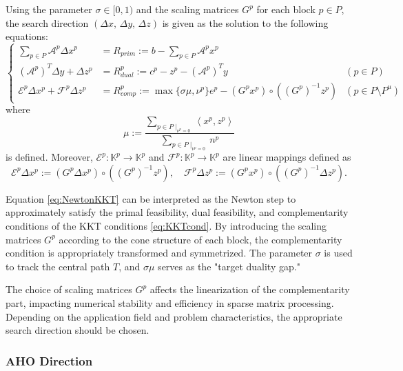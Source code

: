 Using the parameter $\sigma \in [0,1)$ and the scaling matrices $G^p$ for each block $p \in P$, the search direction $(\Delta x,\, \Delta y,\, \Delta z)$ is given as the solution to the following equations:
\begin{equation}
    \renewcommand{\arraystretch}{2.5}
    \left\{
    \begin{array}{rll}
         \sum_{p \in P} \mathcal{A}^p \Delta x^p & = R_{prim} := b - \sum_{p \in P} \mathcal{A}^p x^p &  \\
         (\mathcal{A}^p)^T \Delta y + \Delta z^p & = R_{dual}^p := c^p - z^p - (\mathcal{A}^p)^T y & (p \in P) \\
         \mathcal{E}^p \Delta x^p + \mathcal{F}^p \Delta z^p & = R_{comp}^p := \max\{\sigma \mu, \nu^p\} e^p - (G^p x^p) \circ ((G^p)^{-1} z^p) & (p \in P \setminus P^u)
    \end{array}
    \right.
    \label{eq:NewtonKKT}
\end{equation}
where
\begin{equation}
  \mu := \frac{\sum_{p \in P \mid_{\nu^p=0}} \left\langle x^p, z^p \right\rangle}
              {\sum_{p \in P \mid_{\nu^p=0}} n^p}
  \label{eq:mu}
\end{equation}
is defined.
Moreover, $\mathcal{E}^p : \mathbb{K}^p \to \mathbb{K}^p$ and $\mathcal{F}^p : \mathbb{K}^p \to \mathbb{K}^p$ are linear mappings defined as
\[
  \mathcal{E}^p \Delta x^p
    := (G^p \Delta x^p) \circ ((G^p)^{-1} z^p),
  \quad
  \mathcal{F}^p \Delta z^p
    := (G^p x^p) \circ ((G^p)^{-1} \Delta z^p).
\]

Equation \eqref{eq:NewtonKKT} can be interpreted as the Newton step to approximately satisfy the primal feasibility, dual feasibility, and complementarity conditions of the KKT conditions \eqref{eq:KKTcond}.
By introducing the scaling matrices $G^p$ according to the cone structure of each block, the complementarity condition is appropriately transformed and symmetrized.
The parameter $\sigma$ is used to track the central path $T$, and $\sigma \mu$ serves as the "target duality gap."

The choice of scaling matrices $G^p$ affects the linearization of the complementarity part, impacting numerical stability and efficiency in sparse matrix processing.
Depending on the application field and problem characteristics, the appropriate search direction should be chosen.

\medskip


\subsubsection{AHO Direction}

